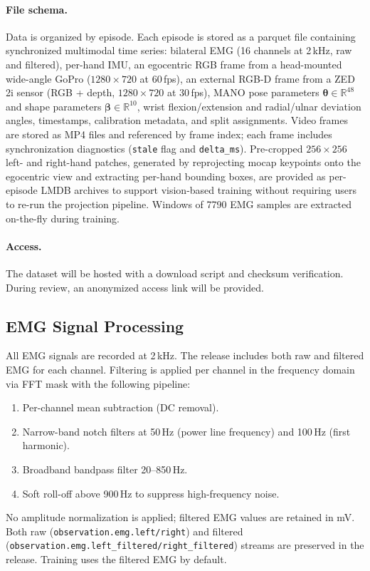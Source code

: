 \documentclass{article}
\begin{document}
\paragraph{File schema.}
Data is organized by episode. Each episode is stored as a parquet file containing synchronized multimodal time series: bilateral EMG (16 channels at 2\,kHz, raw and filtered), per-hand IMU, an egocentric RGB frame from a head-mounted wide-angle GoPro ($1280 \times 720$ at 60\,fps), an external RGB-D frame from a ZED 2i sensor (RGB + depth, $1280 \times 720$ at 30\,fps), MANO pose parameters $\boldsymbol{\theta} \in \mathbb{R}^{48}$ and shape parameters $\boldsymbol{\beta} \in \mathbb{R}^{10}$, wrist flexion/extension and radial/ulnar deviation angles, timestamps, calibration metadata, and split assignments. Video frames are stored as MP4 files and referenced by frame index; each frame includes synchronization diagnostics (\texttt{stale} flag and \texttt{delta\_ms}). Pre-cropped $256\times256$ left- and right-hand patches, generated by reprojecting mocap keypoints onto the egocentric view and extracting per-hand bounding boxes, are provided as per-episode LMDB archives to support vision-based training without requiring users to re-run the projection pipeline. Windows of 7790 EMG samples are extracted on-the-fly during training.

\paragraph{Access.}
The dataset will be hosted with a download script and checksum verification. During review, an anonymized access link will be provided.

\subsection{EMG Signal Processing}
\label{app:emg_processing}

All EMG signals are recorded at 2\,kHz. The release includes both raw and filtered EMG for each channel. Filtering is applied per channel in the frequency domain via FFT mask with the following pipeline:
\begin{enumerate}[leftmargin=1.5em,nosep]
    \item Per-channel mean subtraction (DC removal).
    \item Narrow-band notch filters at 50\,Hz (power line frequency) and 100\,Hz (first harmonic).
    \item Broadband bandpass filter 20--850\,Hz.
    \item Soft roll-off above 900\,Hz to suppress high-frequency noise.
\end{enumerate}
No amplitude normalization is applied; filtered EMG values are retained in mV. Both raw (\texttt{observation.emg.left/right}) and filtered (\texttt{observation.emg.left\_filtered/right\_filtered}) streams are preserved in the release. Training uses the filtered EMG by default.
\end{document}
